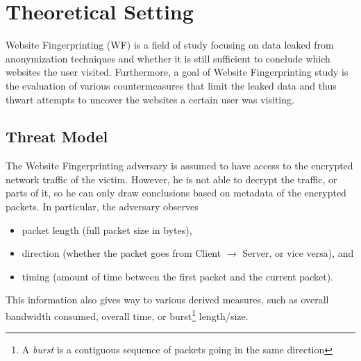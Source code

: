 \documentclass[
	ruledheaders=chapter,
	class=report,
	thesis={type=master, department=inf},
	accentcolor=1c,
	custommargins=true,
	marginpar=false,
	parskip=half-,
	fontsize=11pt,
]{tudapub}
\begin{document}
	\section{Theoretical Setting}
	\label{theoretical}
	
	Website Fingerprinting (WF) is a field of study focusing on data leaked from anonymization 
	techniques and whether it is still sufficient to conclude which websites the user visited.
	Furthermore, a goal of Website Fingerprinting study is the evaluation of various countermeasures
	that limit the leaked data and thus thwart attempts to uncover the websites a certain user was
	visiting.
	
	\subsection{Threat Model}
	\label{theoretical:threat_model}
	
	The Website Fingerprinting adversary is assumed to have access to the encrypted network traffic of the victim. However, he is not able to decrypt the traffic, or parts of it, so he can only draw conclusions based on metadata of the encrypted packets. In particular, the adversary observes 
	
	\begin{itemize}
		\item packet length (full packet size in bytes),
		\item direction (whether the packet goes from Client $\to$ Server, or vice versa), and
		\item timing (amount of time between the first packet and the current packet).
	\end{itemize}

	This information also gives way to various derived measures, such as overall bandwidth consumed, overall time, or burst\footnote{A \textit{burst} is a contiguous sequence of packets going in the same direction} length/size.
	
\end{document}
